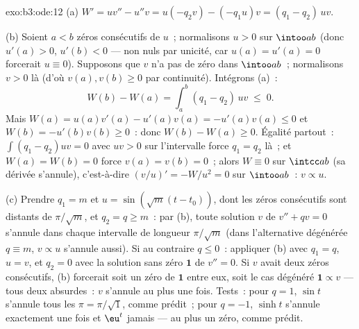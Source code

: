 \begin{solution}{exo:b3:ode:12}
(a) $W' = uv'' - u''v = u(-q_2v) - (-q_1u)v = (q_1 -
q_2)\,uv$.

(b) Soient $a < b$ zéros consécutifs de $u$~; normalisons $u >
0$ sur $\intoo ab$ (donc $u'(a) > 0$, $u'(b) < 0$ --- non
nuls par unicité, car $u(a) = u'(a) = 0$ forcerait $u \equiv
0$). Supposons que $v$ n'a pas de zéro dans $\intoo ab$~;
normalisons $v > 0$ là (d'où $v(a), v(b) \geq 0$ par
continuité). Intégrons (a)~:
\[
W(b) - W(a) = \int_a^b(q_1 - q_2)\,uv \;\leq\; 0 .
\]
Mais $W(a) = u(a)v'(a) - u'(a)v(a) = -u'(a)v(a) \leq 0$ et
$W(b) = -u'(b)v(b) \geq 0$~: donc $W(b) - W(a) \geq 0$.
Égalité partout~: $\int(q_1 - q_2)uv = 0$ avec $uv > 0$ sur
l'intervalle  force $q_1 = q_2$ là~; et $W(a) = W(b) =
0$ force $v(a) = v(b) = 0$~; alors $W \equiv 0$ sur
$\intcc ab$ (sa dérivée s'annule), c'est-à-dire
$(v/u)' = -W/u^2 = 0$ sur $\intoo ab$~: $v \propto u$.

(c) Prendre $q_1 = m$ et $u = \sin(\sqrt m(t - t_0))$, dont
les zéros consécutifs sont distants de $\pi/\sqrt m$, et $q_2
= q \geq m$~: par (b), toute solution $v$ de $v'' + qv = 0$
s'annule dans chaque intervalle  de longueur
$\pi/\sqrt m$ (dans l'alternative dégénérée $q \equiv m$, $v
\propto u$ s'annule aussi). Si au contraire $q \leq 0$~:
appliquer (b) avec $q_1 = q$, $u = v$, et $q_2 = 0$ avec la
solution sans zéro $\mathbf 1$ de $v'' = 0$. Si $v$ avait
deux zéros consécutifs, (b) forcerait soit un zéro de
$\mathbf 1$ entre eux, soit le cas dégénéré $\mathbf 1
\propto v$ --- tous deux absurdes~: $v$ s'annule au plus une
fois. Tests~: pour $q = 1$, $\sin t$ s'annule tous les $\pi =
\pi/\sqrt1$, comme prédit~; pour $q = -1$, $\sinh t$
s'annule exactement une fois et $\eu^t$ jamais --- au plus un
zéro, comme prédit.
\end{solution}

